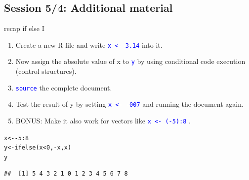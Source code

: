 \documentclass[xcolor=table,       handout,    xcolor=dvipsnames]{beamer}\usepackage[]{graphicx}\usepackage[]{color}
\makeatletter
\newcommand{\hlnum}[1]{\textcolor[rgb]{0,0,0}{#1}}
\newcommand{\hlopt}[1]{\textcolor[rgb]{0,0,0}{#1}}
\newcommand{\hlstd}[1]{\textcolor[rgb]{0,0,0}{#1}}
\newcommand{\hlkwb}[1]{\textcolor[rgb]{0,0,0}{#1}}
\newcommand{\hlkwd}[1]{\textcolor[rgb]{0,0,1}{#1}}
\newenvironment{kframe}{%
 \def\at@end@of@kframe{}%
 \ifinner\ifhmode%
  \def\at@end@of@kframe{\end{minipage}}%
  \begin{minipage}{\columnwidth}%
 \fi\fi%
 \def\FrameCommand##1{\hskip\@totalleftmargin \hskip-\fboxsep
 \colorbox{shadecolor}{##1}\hskip-\fboxsep
     \hskip-\linewidth \hskip-\@totalleftmargin \hskip\columnwidth}%
 \MakeFramed {\advance\hsize-\width
   \@totalleftmargin\z@ \linewidth\hsize
   \@setminipage}}%
 {\par\unskip\endMakeFramed%
 \at@end@of@kframe}
\newenvironment{knitrout}{}{} %
\newcommand{\rcode}[1]{\texttt{\textcolor{Blue}{#1}}} %
\makeatother
\begin{document}
\subsection{Session 5/4: Additional material}

\begin{frame}[fragile]{recap \alert{if else} I}
\begin{enumerate}
\item Create a new R file and write \rcode{x <- 3.14} into it.
\item Now  assign the absolute value of x to \rcode{y} by using conditional code execution (control structures).
\item \rcode{source} the complete document.
\item Test the result of y by setting \rcode{x <- -007} and running the document again.
\item BONUS: Make it also work for vectors like \rcode{x <- (-5):8} .
\end{enumerate}
\pause
\begin{knitrout}
\color{fgcolor}\begin{kframe}
\begin{alltt}
\hlstd{x} \hlkwb{<-} \hlopt{-}\hlnum{5}\hlopt{:}\hlnum{8}
\hlstd{y} \hlkwb{<-} \hlkwd{ifelse}\hlstd{(x}\hlopt{<}\hlnum{0}\hlstd{,} \hlopt{-}\hlstd{x, x)}
\hlstd{y}
\end{alltt}
\begin{verbatim}
##  [1] 5 4 3 2 1 0 1 2 3 4 5 6 7 8
\end{verbatim}
\end{kframe}
\end{knitrout}
\end{frame}

\end{document}
